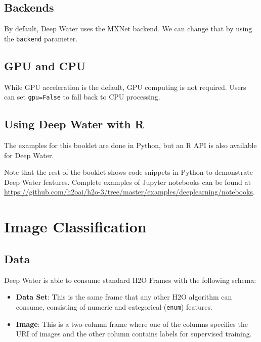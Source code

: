 \waterExampleInPython


	\subsection{Backends}
		By default, Deep Water uses the MXNet backend.  We can change that by using the \texttt{backend} parameter.  

\waterExampleInPython


\newpage
	\subsection{GPU and CPU}
		While GPU acceleration is the default, GPU computing is not required. Users can set \texttt{gpu=False} to fall back to CPU processing.

\waterExampleInPython


	\subsection{Using Deep Water with R}
		The examples for this booklet are done in Python, but an R API is also available for Deep Water.
	
		\waterExampleInR
		
	
Note that the rest of the booklet shows code snippets in Python to demonstrate Deep Water features.  Complete examples of Jupyter notebooks can be found at {\url{https://github.com/h2oai/h2o-3/tree/master/examples/deeplearning/notebooks}}.

\newpage
\section{Image Classification}

	\subsection{Data}\label{sec:data}
		Deep Water is able to consume standard H2O Frames with the following schema:
		\begin{itemize}
			\item{\textbf{Data Set}}: This is the same frame that any other H2O algorithm can consume, consisting of numeric and categorical (\texttt{enum}) features.

			\item{\textbf{Image}}: This is a two-column frame where one of the columns specifies the URI of images and the other column contains labels for supervised training.

		\end{itemize}
		
